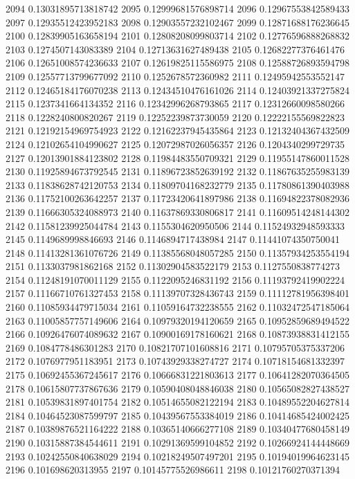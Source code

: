 2094 0.13031895713818742
2095 0.12999681576898714
2096 0.12967553842589433
2097 0.12935512423952183
2098 0.12903557232102467
2099 0.12871688176236645
2100 0.12839905163658194
2101 0.12808208099803714
2102 0.12776596888268832
2103 0.1274507143083389
2104 0.12713631627489438
2105 0.12682277376461476
2106 0.12651008574236633
2107 0.12619825115586975
2108 0.12588726893594798
2109 0.12557713799677092
2110 0.1252678572360982
2111 0.12495942553552147
2112 0.12465184176070238
2113 0.12434510476161026
2114 0.12403921337275824
2115 0.1237341664134352
2116 0.12342996268793865
2117 0.12312660098580266
2118 0.1228240800820267
2119 0.12252239873730059
2120 0.12222155569822823
2121 0.12192154969754923
2122 0.12162237945435864
2123 0.12132404367432509
2124 0.12102654104990627
2125 0.12072987026056357
2126 0.1204340299729735
2127 0.12013901884123802
2128 0.11984483550709321
2129 0.11955147860011528
2130 0.11925894673792545
2131 0.11896723852639192
2132 0.11867635255983139
2133 0.11838628742120753
2134 0.11809704168232779
2135 0.11780861390403988
2136 0.11752100263642257
2137 0.11723420641897986
2138 0.11694822378082936
2139 0.11666305324088973
2140 0.11637869330806817
2141 0.11609514248144302
2142 0.11581239925044784
2143 0.1155304620950506
2144 0.11524932948593333
2145 0.1149689998846693
2146 0.1146894717438984
2147 0.11441074350750041
2148 0.11413281361076726
2149 0.11385568048057285
2150 0.11357934253554194
2151 0.1133037981862168
2152 0.11302904583522179
2153 0.1127550838774273
2154 0.11248191070011129
2155 0.1122095246831192
2156 0.11193792419902224
2157 0.11166710761327453
2158 0.11139707328436743
2159 0.11112781956398401
2160 0.11085934479715034
2161 0.11059164732238555
2162 0.11032472547185064
2163 0.11005857757149606
2164 0.10979320194120659
2165 0.10952859689494522
2166 0.10926476074089632
2167 0.10900169178160621
2168 0.10873938831412155
2169 0.1084778486301283
2170 0.10821707101608816
2171 0.10795705375337206
2172 0.1076977951183951
2173 0.10743929338274727
2174 0.10718154681332397
2175 0.10692455367245617
2176 0.10666831221803613
2177 0.10641282070364505
2178 0.10615807737867636
2179 0.10590408048846038
2180 0.10565082827438527
2181 0.10539831897401754
2182 0.10514655082122194
2183 0.10489552204627814
2184 0.10464523087599797
2185 0.10439567553384019
2186 0.10414685424002425
2187 0.10389876521164222
2188 0.10365140666277108
2189 0.10340477680458149
2190 0.10315887384544611
2191 0.10291369599104852
2192 0.10266924144448669
2193 0.10242550840638029
2194 0.10218249507497201
2195 0.10194019964623145
2196 0.101698620313955
2197 0.10145775526986611
2198 0.10121760270371394
